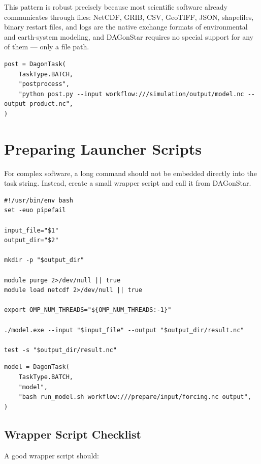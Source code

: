 This pattern is robust precisely because most scientific software already
communicates through files: NetCDF, GRIB, CSV, GeoTIFF, JSON, shapefiles,
binary restart files, and logs are the native exchange formats of
environmental and earth-system modeling, and DAGonStar requires no special
support for any of them --- only a file path.

\begin{lstlisting}[caption={A post-processing step referencing simulation output.}]
post = DagonTask(
    TaskType.BATCH,
    "postprocess",
    "python post.py --input workflow:///simulation/output/model.nc --output product.nc",
)
\end{lstlisting}

\section{Preparing Launcher Scripts}

For complex software, a long command should not be embedded directly into
the task string. Instead, create a small wrapper script and call it from
DAGonStar.

\begin{lstlisting}[style=bash, caption={\texttt{run\_model.sh}: a defensive wrapper around a compiled model.}]
#!/usr/bin/env bash
set -euo pipefail

input_file="$1"
output_dir="$2"

mkdir -p "$output_dir"

module purge 2>/dev/null || true
module load netcdf 2>/dev/null || true

export OMP_NUM_THREADS="${OMP_NUM_THREADS:-1}"

./model.exe --input "$input_file" --output "$output_dir/result.nc"

test -s "$output_dir/result.nc"
\end{lstlisting}

\begin{lstlisting}[caption={The corresponding DAGonStar task.}]
model = DagonTask(
    TaskType.BATCH,
    "model",
    "bash run_model.sh workflow:///prepare/input/forcing.nc output",
)
\end{lstlisting}

\subsection{Wrapper Script Checklist}

A good wrapper script should:

